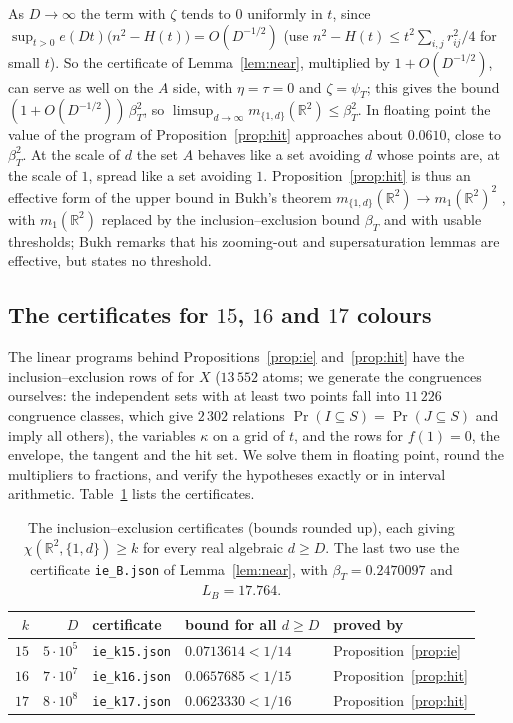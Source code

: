 \documentclass[11pt,a4paper]{amsart}
\theoremstyle{definition}
\theoremstyle{remark}
\newcommand{\R}{\mathbb{R}}
\begin{document}
As $D\to\infty$ the term with $\zeta$ tends to $0$ uniformly in $t$, since
$\sup_{t>0}e(Dt)\bigl(n^2-H(t)\bigr)=O(D^{-1/2})$ (use $n^2-H(t)\le t^2\sum_{i,j}r_{ij}^2/4$ for small $t$). So the
certificate of Lemma~\ref{lem:near}, multiplied by $1+O(D^{-1/2})$, can serve as well on the $A$ side, with
$\eta=\tau=0$ and $\zeta=\psi_T$; this gives the bound $(1+O(D^{-1/2}))\,\beta_T^2$, so
$\limsup_{d\to\infty}m_{\{1,d\}}(\R^2)\le\beta_T^2$. In floating point the value of the program of
Proposition~\ref{prop:hit} approaches about $0.0610$, close to $\beta_T^2$. At the scale of $d$ the set $A$ behaves
like a set avoiding $d$ whose points are, at the scale of $1$, spread like a set avoiding $1$. Proposition~\ref{prop:hit}
is thus an effective form of the upper bound in Bukh's theorem $m_{\{1,d\}}(\R^2)\to m_1(\R^2)^2$ \cite{Bukh}, with
$m_1(\R^2)$ replaced by the inclusion--exclusion bound $\beta_T$ and with usable thresholds; Bukh remarks that his
zooming-out and supersaturation lemmas are effective, but states no threshold.


\subsection*{The certificates for $15$, $16$ and $17$ colours}
The linear programs behind Propositions~\ref{prop:ie} and~\ref{prop:hit} have the inclusion--exclusion rows of
\cite{ACMVZ} for $X$ ($13\,552$ atoms; we generate the congruences ourselves: the independent sets with at least
two points fall into $11\,226$ congruence classes, which give $2\,302$ relations $\Pr(I\subseteq S)=\Pr(J\subseteq S)$
and imply all others), the variables $\kappa$ on a grid of $t$, and the rows for $f(1)=0$, the envelope, the tangent
and the hit set. We solve them in floating point, round the multipliers to fractions, and verify the hypotheses
exactly or in interval arithmetic. Table~\ref{tab:ie} lists the certificates.

\begin{table}[ht]
\centering
\small
\begin{tabular}{rrlll}
\toprule
$k$ & $D$ & certificate & bound for all $d\ge D$ & proved by\\
\midrule
$15$ & $5\cdot10^5$ & \texttt{ie\_k15.json} & $0.0713614<1/14$ & Proposition~\ref{prop:ie}\\
$16$ & $7\cdot10^7$ & \texttt{ie\_k16.json} & $0.0657685<1/15$ & Proposition~\ref{prop:hit}\\
$17$ & $8\cdot10^8$ & \texttt{ie\_k17.json} & $0.0623330<1/16$ & Proposition~\ref{prop:hit}\\
\bottomrule
\end{tabular}
\caption{The inclusion--exclusion certificates (bounds rounded up), each giving $\chi(\R^2,\{1,d\})\ge k$ for every
real algebraic $d\ge D$. The last two use the certificate \texttt{ie\_B.json} of Lemma~\ref{lem:near}, with
$\beta_T=0.2470097$ and $L_B=17.764$.}
\label{tab:ie}
\end{table}
\end{document}
